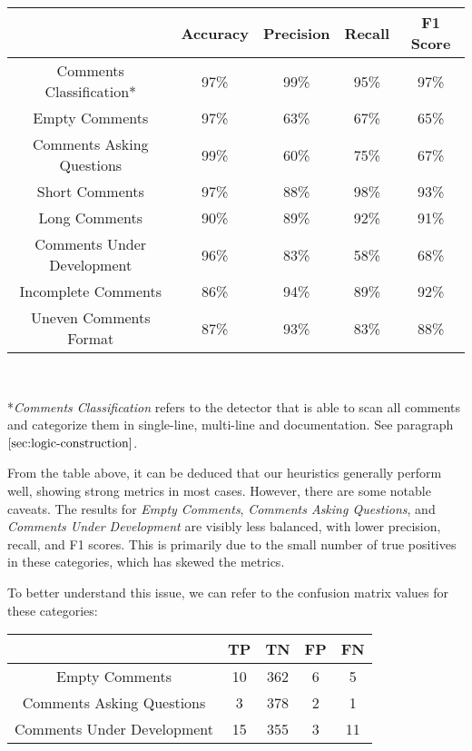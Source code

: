 \begin{center}
	\begin{tabular}{|c|c|c|c|c|}
		\hline
		& \textbf{Accuracy} & \textbf{Precision} & \textbf{Recall} & \textbf{F1 Score} \\
		\hline Comments Classification*    & 97\%     & 99\%      & 95\%   & 97\%    \\
		\hline Empty Comments             & 97\%     & 63\%      & 67\%   & 65\%    \\
		\hline Comments Asking Questions  & 99\%     & 60\%      & 75\%   & 67\%    \\
		\hline Short Comments             & 97\%     & 88\%      & 98\%   & 93\%    \\
		\hline Long Comments              & 90\%     & 89\%      & 92\%   & 91\%    \\
		\hline Comments Under Development & 96\%     & 83\%      & 58\%   & 68\%    \\
		\hline Incomplete Comments        & 86\%     & 94\%      & 89\%   & 92\%    \\
		\hline Uneven Comments Format     & 87\%     & 93\%      & 83\%   & 88\%   \\
		\hline
	\end{tabular}
	
	\textit{\\}
	
	*\textit{Comments Classification} refers to the detector that is able to scan all comments and categorize them in single-line, multi-line and documentation. See paragraph $\ref{sec:logic-construction}$.
\end{center}

\noindent From the table above, it can be deduced that our heuristics generally perform well, showing strong metrics in most cases. However, there are some notable caveats. The results for \textit{Empty Comments}, \textit{Comments Asking Questions}, and \textit{Comments Under Development} are visibly less balanced, with lower precision, recall, and F1 scores. This is primarily due to the small number of true positives in these categories, which has skewed the metrics.

\noindent To better understand this issue, we can refer to the confusion matrix values for these categories:
\begin{center}
	\begin{tabular}{|c|c|c|c|c|}
		\hline
		& \textbf{TP} & \textbf{TN} & \textbf{FP} & \textbf{FN} \\
		\hline Empty Comments             & 10     & 362      & 6   & 5    \\
		\hline Comments Asking Questions  & 3     & 378      & 2   & 1    \\
		\hline Comments Under Development & 15     & 355      & 3   & 11    \\
		\hline
	\end{tabular}
\end{center}


